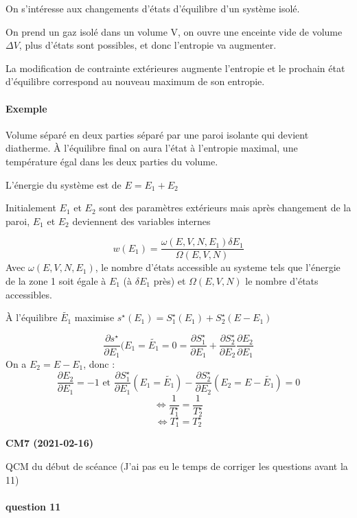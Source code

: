 \documentclass[12pt,a4paper]{report}
\begin{document}
On s'intéresse aux changements d'états d'équilibre d'un système isolé.

On prend un gaz isolé dans un volume V, on ouvre une enceinte vide de volume \(\Delta V\), plus d'états sont possibles, et donc l'entropie va augmenter.

La modification de contrainte extérieures augmente l'entropie et le prochain état d'équilibre correspond au nouveau maximum de son entropie.

\paragraph{Exemple}

Volume séparé en deux parties séparé par une paroi isolante qui devient diatherme. À l'équilibre final on aura l'état à l'entropie maximal, une température égal dans les deux parties du volume.

L'énergie du système est de \(E = E_1 + E_2\)

Initialement \(E_1\) et \(E_2\) sont des paramètres extérieurs mais après changement de la paroi, \(E_1\) et \(E_2\) deviennent des variables internes

\[
	w(E_1) = \dfrac{\omega(E,V,N,E_1)\delta E_1}{\Omega(E,V,N)}
\]
Avec \(\omega(E,V,N,E_1)\), le nombre d'états accessible au systeme tels que l'énergie de la zone 1 soit égale à \(E_1\) (à \(\delta E_1\) près) et \(\Omega(E,V,N)\) le nombre d'états accessibles.

À l'équilibre \(\tilde{E_1}\) maximise \(s^\star(E_1) = S_1^\star(E_1) + S_2^\star(E-E_1)\)

\[
	\dfrac{\partial s^\star}{\partial E_1}(E_1 = \tilde{E_1} = 0 = \dfrac{\partial S_1^\star}{\partial E_1} + \dfrac{\partial S_2^\star}{\partial E_2} \dfrac{\partial E_2}{\partial E_1}
\]
On a \(E_2 = E-E_1\), donc :
\[
	\dfrac{\partial E_2}{\partial E_1} = -1 \text{ et } \dfrac{\partial S_1^\star}{\partial E_1} (E_1 = \tilde{E_1}) - \dfrac{\partial S_2^\star}{\partial E_2} (E_2 = E - \tilde{E_1}) = 0
\]
\[
	\Leftrightarrow \dfrac{1}{T_1^\star} = \dfrac{1}{T_2^\star}
\]
\[
	\Leftrightarrow T_1^\star = T_2^\star
\]

\begin{center}
\textbf{CM7 (2021-02-16)}
\end{center}

QCM du début de scéance (J'ai pas eu le temps de corriger les questions avant la 11)

\paragraph{question 11}
\end{document}
